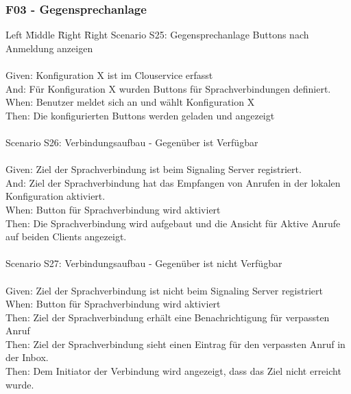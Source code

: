 \subsubsection*{F03 - Gegensprechanlage}
\begin{tabbing}
    Left \= Middle \= Right \= Right \kill
    Scenario S25: \> \> \> Gegensprechanlage Buttons nach Anmeldung anzeigen \\ \\
    Given:  \> \> \>  Konfiguration X ist im Clouservice erfasst\\
    And:  \> \> \>  Für Konfiguration X wurden Buttons für Sprachverbindungen definiert.  \\
    When:   \> \> \> Benutzer meldet sich an und wählt Konfiguration X\\
    Then:   \> \> \> Die konfigurierten Buttons werden geladen und angezeigt\\
    \\
    Scenario S26: \> \> \> Verbindungsaufbau - Gegenüber ist Verfügbar \\ \\
    Given:  \> \> \> Ziel der Sprachverbindung ist beim Signaling Server registriert. \\
    And:  \> \> \> Ziel der Sprachverbindung hat das Empfangen von Anrufen in der lokalen Konfiguration aktiviert. \\
    When:   \> \> \> Button für Sprachverbindung wird aktiviert \\
    Then:   \> \> \> Die Sprachverbindung wird aufgebaut und die Ansicht für Aktive Anrufe auf beiden Clients angezeigt.\\
    \\
    Scenario S27: \> \> \> Verbindungsaufbau - Gegenüber ist nicht Verfügbar \\ \\
    Given:  \> \> \> Ziel der Sprachverbindung ist nicht beim Signaling Server registriert\\
    When:   \> \> \> Button für Sprachverbindung wird aktiviert\\
    Then:   \> \> \> Ziel der Sprachverbindung erhält eine Benachrichtigung für verpassten Anruf\\
    Then:   \> \> \> Ziel der Sprachverbindung sieht einen Eintrag für den verpassten Anruf in der Inbox.\\
    Then:   \> \> \> Dem Initiator der Verbindung wird angezeigt, dass das Ziel nicht erreicht wurde. \\
    \\

\end{tabbing}
